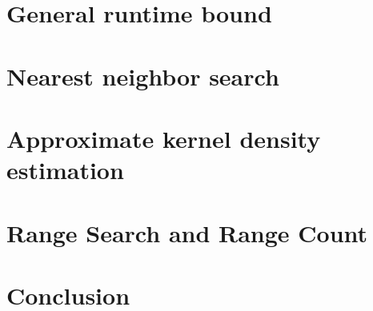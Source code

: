 \documentclass[twoside,11pt]{article} %
\begin{document}
\section{General runtime bound}
\label{sec:bound}



\section{Nearest neighbor search}
\label{sec:nns}



\section{Approximate kernel density estimation}
\label{sec:akde}



\section{Range Search and Range Count}
\label{sec:rs}




%

\section{Conclusion}



%


\appendix

\end{document}
